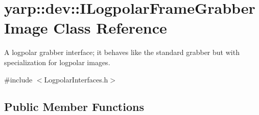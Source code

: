 \section{yarp\+:\+:dev\+:\+:I\+Logpolar\+Frame\+Grabber\+Image Class Reference}
\label{classyarp_1_1dev_1_1ILogpolarFrameGrabberImage}


A logpolar grabber interface; it behaves like the standard grabber but with specialization for logpolar images.  




{\ttfamily \#include $<$Logpolar\+Interfaces.\+h$>$}

\subsection*{Public Member Functions}
